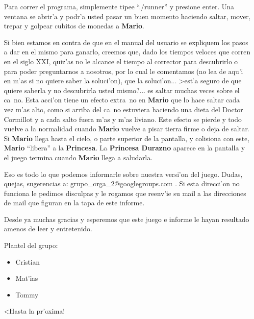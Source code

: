 	Para correr el programa, simplemente tipee ``./runner'' y presione enter.
Una ventana se abrir'a y podr'a usted pasar un buen momento haciendo saltar,
mover, trepar y golpear cubitos de monedas a \textbf{Mario}.

	Si bien estamos en contra de que en el manual del usuario se expliquem los
pasos a dar en el mismo para ganarlo, creemos que, dado los tiempos veloces
que corren en el siglo XXI, quiz'as no le alcance el tiempo al corrector para
descubrirlo o para poder preguntarnos a nosotros, por lo cual le comentamos (no
lea de aqu'i en m'as si no quiere saber la soluci'on), que la soluci'on...
>est'a seguro de que quiere saberla y no descubrirla usted mismo?... es saltar
muchas veces sobre el ca~no. Esta acci'on tiene un efecto extra~no en
\textbf{Mario} que
lo hace saltar cada vez m'as alto, como si arriba del ca~no estuviera haciendo
una dieta del Doctor Cormillot y a cada salto fuera m'as y m'as liviano. Este
efecto se pierde y todo vuelve a la normalidad cuando \textbf{Mario} vuelve a pisar
tierra firme o deja de saltar. Si \textbf{Mario} llega hasta el cielo, o parte superior
de la pantalla, y colisiona con este, \textbf{Mario} ``libera'' a la
\textbf{Princesa}. La \textbf{Princesa Durazno} aparece en la pantalla y el
juego termina cuando \textbf{Mario} llega a saludarla.

	Eso es todo lo que podemos informarle sobre nuestra versi'on del juego.
Dudas, quejas, sugerencias a: grupo\_orga\_2@googlegroups.com . Si esta
direcci'on no funciona le pedimos disculpas y le rogamos que reenv'ie su mail a
las direcciones de mail que figuran en la tapa de este informe. 

	Desde ya muchas gracias y esperemos que este juego e informe le hayan
resultado amenos de leer y entretenido.

	Plantel del grupo:
\begin{itemize}
 \item Cristian
 \item Mat'ias
 \item Tommy
\end{itemize}

	<Hasta la pr'oxima!

